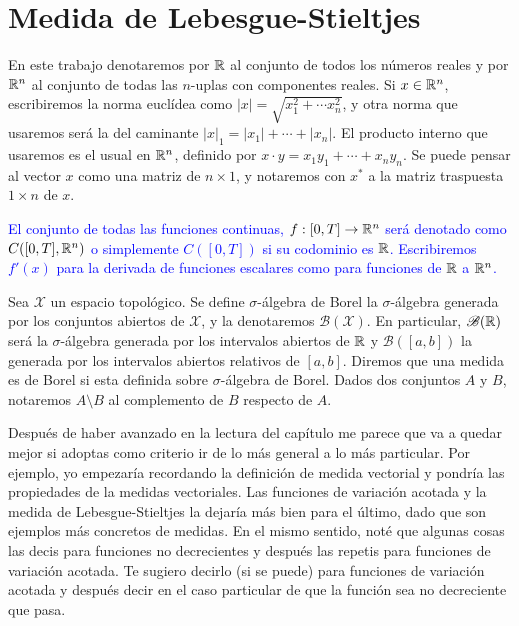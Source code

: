 \chapter{Medida de Lebesgue-Stieltjes}




En este trabajo denotaremos por $\mathbb{R}$ al conjunto de todos los números reales y por $\mathbb{R}^n$ al conjunto de todas las $n$-uplas con componentes reales.  Si $x\in \mathbb{R}^n$, escribiremos la norma euclídea como $|x|=\sqrt{x_1^2+\cdots x_n^2}$, y otra norma que usaremos será la del caminante  $|x|_1=|x_1|+\cdots +|x_n|$.   
El producto interno que usaremos es el  usual en $\mathbb{R}^n $, definido por  $x\cdot y=x_1y_1 + \cdots+
x_ny_n$. Se puede pensar al vector $x$ como una matriz de $n\times 1$, y notaremos con $x^*$ a la matriz traspuesta $1\times n$ de $x$.

\textcolor{blue}{El conjunto de todas las funciones continuas, $f:[0,T]\to \mathbb{R}^n$ será denotado como $C([0,T],\mathbb{R}^n)$ o simplemente $C([0,T])$ si su codominio es $\mathbb{R}$.    Escribiremos $f'(x)$ para la derivada de funciones escalares como para funciones de $\mathbb{R}$ a $\mathbb{R}^n$. }

Sea $\mathcal{X}$ un espacio topológico. Se define   $\sigma$-álgebra  de Borel  la $\sigma$-álgebra generada por los conjuntos abiertos de $\mathcal{X}$, y la  denotaremos $\mathscr{B}(\mathcal{X})$. 
En particular, $\mathscr{B}(\mathbb{R})$ será la $\sigma$-álgebra generada por los intervalos abiertos de $\mathbb{R}$ y $\mathscr{B}([a,b])$ la generada por los intervalos abiertos relativos de $[a,b]$. Diremos que una medida es de Borel si esta definida sobre  $\sigma$-álgebra de Borel.  Dados dos conjuntos $A$ y $B$, notaremos $A\setminus B$ al complemento de $B$ respecto de $A$.




{\color{green} Después de haber avanzado en la lectura del capítulo me parece que va a quedar mejor si adoptas como  criterio ir de lo más general a lo más particular. Por ejemplo, yo empezaría recordando la definición de medida vectorial y pondría las propiedades de la medidas vectoriales. Las funciones de variación  acotada y la medida de Lebesgue-Stieltjes la dejaría más bien para el último, dado que son ejemplos más concretos de medidas. En el mismo sentido, noté que algunas cosas las decis para funciones no decrecientes  y después las repetis para funciones de variación acotada. Te sugiero decirlo (si se puede) para funciones de variación acotada y después decir en el caso particular de que la función sea no decreciente que pasa.
}


